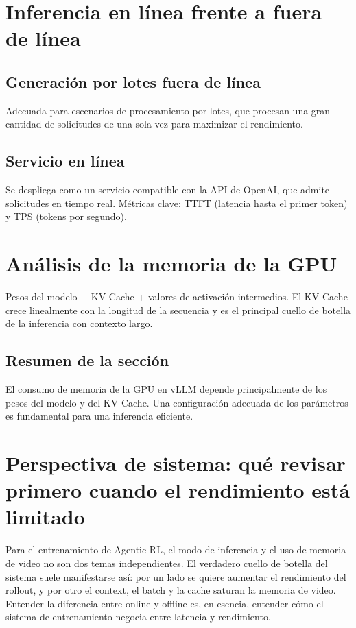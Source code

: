 \documentclass[a4paper]{article}
\begin{document}
\section{Inferencia en línea frente a fuera de línea}
\subsection{Generación por lotes fuera de línea}
Adecuada para escenarios de procesamiento por lotes, que procesan una gran cantidad de solicitudes de una sola vez para maximizar el rendimiento.

\subsection{Servicio en línea}
Se despliega como un servicio compatible con la API de OpenAI, que admite solicitudes en tiempo real. Métricas clave: TTFT (latencia hasta el primer token) y TPS (tokens por segundo).

\section{Análisis de la memoria de la GPU}
Pesos del modelo + KV Cache + valores de activación intermedios. El KV Cache crece linealmente con la longitud de la secuencia y es el principal cuello de botella de la inferencia con contexto largo.

\subsection{Resumen de la sección}
El consumo de memoria de la GPU en vLLM depende principalmente de los pesos del modelo y del KV Cache. Una configuración adecuada de los parámetros es fundamental para una inferencia eficiente.

\section{Perspectiva de sistema: qué revisar primero cuando el rendimiento está limitado}
Para el entrenamiento de Agentic RL, el modo de inferencia y el uso de memoria de video no son dos temas independientes. El verdadero cuello de botella del sistema suele manifestarse así: por un lado se quiere aumentar el rendimiento del rollout, y por otro el context, el batch y la cache saturan la memoria de video. Entender la diferencia entre online y offline es, en esencia, entender cómo el sistema de entrenamiento negocia entre latencia y rendimiento.
\end{document}
